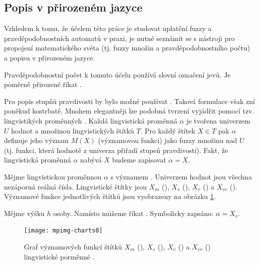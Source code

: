 \documentclass[a4paper,10pt]{article}
\begin{document}
\subsection{Popis v přirozeném jazyce}
Vzhledem k tomu, že účelem této práce je studovat uplatění fuzzy a pravděpodobnostních automatů v praxi, je nutné seznámit se s nástroji pro propojení matematického světa (tj. fuzzy množin a pravděpodobnostního počtu) a popisu v přirozeném jazyce.

Pravděpodobnostní počet k tomuto účelu používá slovní označení jevů. Je poměrně přirozené říkat .

Pro popis stupňů pravdivosti by bylo možné používat . Taková formulace však zní poněkud kostrbatě. Mnohem elegantněji lze podobná tvrzení vyjádřit pomocí tzv. lingvistikých proměnných \cite{Zad-ConLingVarAppApprRea}. Každá lingvistická proměnná $\alpha$ je tvořena univerzem $U$ hodnot a množinou lingvistických štítků $T$. Pro každý štítek $X \in T$ pak $\alpha$ definuje jeho význam $M(X)$ (významovou funkci) jako fuzzy množinu nad $U$ (tj. funkci, která hodnotě z univerza přiřadí stupeň pravdivosti). Fakt, že lingvistická proměnná $\alpha$ nabývá  $X$ budeme zapisovat $\alpha = X$.

\begin{example}
 Mějme lingvistickou proměnnou $\alpha$ s významem . Univerzem hodnot jsou všechna nezáporná reálná čísla. Lingvistické štítky jsou $X_m$ (), $X_s$ (), $X_v$ () a $X_{vv}$ (). Významové funkce jednotlivých štítků jsou vyobrazeny na obrázku \ref{fig:lingVarsMeansChart}.

 Mějme výšku $h$ osoby. Namísto  můžeme říkat . Symbolicky zapsáno: $\alpha = X_s$.
\end{example}

\begin{figure}
 \centering
 \texttt{[image: mpimg-charts0]}
 
 \caption[Graf významových funkcí štítků]{Graf významových funkcí štítků $X_m$ (), $X_s$ (), $X_v$ () a $X_{vv}$ () lingvistické porměnné .} \label{fig:lingVarsMeansChart}
\end{figure}
\end{document}
